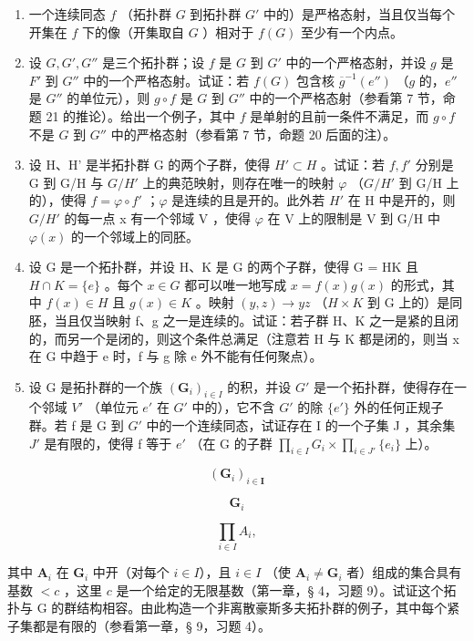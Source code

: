 \begin{enumerate}
\def\labelenumi{\arabic{enumi})}
\setcounter{enumi}{17}
\item
  一个连续同态 \(f\) （拓扑群 \(G\) 到拓扑群 \(G'\) 中的）是严格态射，当且仅当每个开集在 \(f\) 下的像（开集取自 \(G\) ）相对于 \(f(G)\) 至少有一个内点。
\item
  设 \(G, G', G''\) 是三个拓扑群；设 \(f\) 是 \(G\) 到 \(G'\) 中的一个严格态射，并设 \(g\) 是 \(F'\) 到 \(G''\) 中的一个严格态射。试证：若 \(f(G)\) 包含核 \(\overline{g}^{-1}(e'')\) （\(g\) 的，\(e''\) 是 \(G''\) 的单位元），则 \(g \circ f\) 是 \(G\) 到 \(G''\) 中的一个严格态射（参看第 7 节，命题 21 的推论）。给出一个例子，其中 \(f\) 是单射的且前一条件不满足，而 \(g \circ f\) 不是 \(G\) 到 \(G''\) 中的严格态射（参看第 7 节，命题 20 后面的注）。
\item
  设 H、H' 是半拓扑群 G 的两个子群，使得 \(H' \subset H\) 。试证：若 \(f, f'\) 分别是 G 到 G/H 与 \(G/H'\) 上的典范映射，则存在唯一的映射 \(\varphi\) （\(G/H'\) 到 G/H 上的），使得 \(f = \varphi \circ f'\) ；\(\varphi\) 是连续的且是开的。此外若 \(H'\) 在 H 中是开的，则 \(G/H'\) 的每一点 x 有一个邻域 V ，使得 \(\varphi\) 在 V 上的限制是 V 到 G/H 中 \(\varphi(x)\) 的一个邻域上的同胚。
\item
  设 G 是一个拓扑群，并设 H、K 是 G 的两个子群，使得 G = HK 且 \(H \cap K = \{e\}\) 。每个 \(x \in G\) 都可以唯一地写成 \(x = f(x)g(x)\) 的形式，其中 \(f(x) \in H\) 且 \(g(x) \in K\) 。映射 \((y, z) \to yz\) （\(H \times K\) 到 G 上的）是同胚，当且仅当映射 f、g 之一是连续的。试证：若子群 H、K 之一是紧的且闭的，而另一个是闭的，则这个条件总满足（注意若 H 与 K 都是闭的，则当 x 在 G 中趋于 e 时，f 与 g 除 e 外不能有任何聚点）。
\item
  设 G 是拓扑群的一个族 \((\mathbf{G}_{i})_{i\in I}\) 的积，并设 \(G'\) 是一个拓扑群，使得存在一个邻域 \(V'\) （单位元 \(e'\) 在 \(G'\) 中的），它不含 \(G'\) 的除 \(\{e'\}\) 外的任何正规子群。若 f 是 G 到 \(G'\) 中的一个连续同态，试证存在 I 的一个子集 J ，其余集 \(J'\) 是有限的，使得 f 等于 \(e'\) （在 G 的子群 \(\prod_{i\in I}G_{i}\times\prod_{i\in J'}\{e_{i}\}\) 上）。
\end{enumerate}

\[
\left(\mathbf {G} _ {i}\right) _ {i \in \mathbf {I}}
\]

\[
\mathbf {G} _ {i}
\]

\[
\prod_ {i \in I} A _ {i},
\]

其中 \(\mathbf{A}_i\) 在 \(\mathbf{G}_i\) 中开（对每个 \(i \in I\)），且 \(i \in I\) （使 \(\mathbf{A}_i \neq \mathbf{G}_i\) 者）组成的集合具有基数 \(< c\) ，这里 \(c\) 是一个给定的无限基数（第一章，§ 4，习题 9）。试证这个拓扑与 G 的群结构相容。由此构造一个非离散豪斯多夫拓扑群的例子，其中每个紧子集都是有限的（参看第一章，§ 9，习题 4）。

